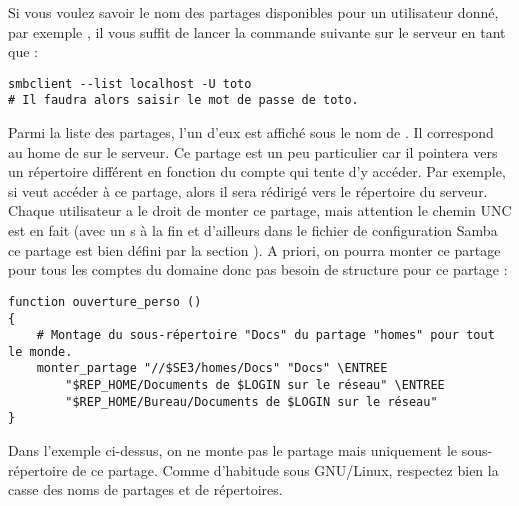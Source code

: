 Si vous voulez savoir le nom des partages disponibles pour
un utilisateur donné, par exemple , il vous
suffit de lancer la commande suivante sur le serveur en tant
que  :
%
%
\begin{lstlisting}
smbclient --list localhost -U toto
# Il faudra alors saisir le mot de passe de toto.
\end{lstlisting}
%
Parmi la liste des partages, l'un d'eux est affiché sous le nom
de . Il correspond au home de 
sur le serveur. Ce partage est un peu particulier car il pointera
vers un répertoire différent en fonction du compte qui tente d'y
accéder. Par exemple, si  veut accéder à ce partage,
alors il sera rédirigé vers le répertoire  du serveur.
Chaque utilisateur a le droit de monter ce partage,
mais attention le chemin UNC est en fait
 (avec un \og s \fg{} à la fin et d'ailleurs
dans le fichier de configuration Samba ce partage est bien défini
par la section ).
A priori, on pourra monter ce partage pour tous les comptes
du domaine donc pas besoin de structure  pour
ce partage :
%
\begin{lstlisting}[emph={ENTREE},emphstyle={\return}]
function ouverture_perso ()
{
    # Montage du sous-répertoire "Docs" du partage "homes" pour tout le monde.
    monter_partage "//$SE3/homes/Docs" "Docs" \ENTREE
        "$REP_HOME/Documents de $LOGIN sur le réseau" \ENTREE
        "$REP_HOME/Bureau/Documents de $LOGIN sur le réseau"
}
\end{lstlisting}
%
Dans l'exemple ci-dessus, on ne monte pas le partage 
mais uniquement le sous-répertoire  de ce partage.
Comme d'habitude sous GNU/Linux, respectez bien la casse des noms de
partages et de répertoires.

